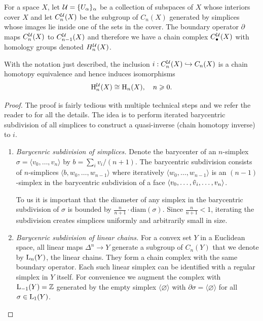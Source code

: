 For a space $X$, let $\mathcal{U}=\{U_\alpha\}_\alpha$ be a collection of subspaces of $X$ whose interiors cover $X$ and let $C_n^{\mathcal{U}}(X)$ be the subgroup of $C_n(X)$ generated by simplices whose images lie inside one of the sets in the cover. The boundary operator $\partial$ maps $C^{\mathcal{U}}_n(X)$ to $C^{\mathcal{U}}_{n-1}(X)$ and therefore we have a chain complex $C_\bullet^{\mathcal{U}}(X)$ with homology groups denoted $H^{\mathcal{U}}_n(X)$.


\begin{prop}\label{thm 2.21 Hatcher}
    With the notation just described, the inclusion $i:C_n^{\mathcal{U}}(X)\hookrightarrow C_n(X)$ is a chain homotopy equivalence and hence induces isomorphisms
    \[\mathrm{H}_n^{\mathcal{U}}(X)\cong \mathrm{H}_n(X),\quad n\geqslant 0.\]
\end{prop}
\begin{proof}
     The proof is fairly tedious with multiple technical steps and we refer the reader to \cite[Thm. 2.21]{Hatcher} for all the details. The idea is to perform iterated barycentric subdivision of all simplices to construct a quasi-inverse (chain homotopy inverse) to $i$. 
     
     \begin{enumerate}
         \item \emph{Barycenric subdivision of simplices.} Denote the barycenter of an $n$-simplex $\sigma=\langle v_0,\ldots,v_n\rangle$ by  $b=\sum_i v_i/(n+1)$. The barycentric subdivision consists of $n$-simplices $\langle b,w_0,\ldots,w_{n-1}
         \rangle$ where iteratively $\langle w_0,\ldots,w_{n-1}\rangle$ is an $(n-1)$-simplex in the barycentric subdivision of a face $\langle v_0,\ldots,\wh{v}_i,\ldots,v_n\rangle$.
         
         To us it is important that the diameter of any simplex in the barycentric subdivision of $\sigma$ is bounded by $\frac{n}{n+1}\cdot \text{diam}(\sigma)$. Since $\frac{n}{n+1}<1$, iterating the subdivision creates simplices uniformly and arbitrarily small in size.
         
         \item \emph{Barycenric subdivision of linear chains.} For a convex set $Y$ in a Euclidean space, all linear maps $\Delta^n\to Y$ generate a subgroup of $C_n(Y)$ that we denote by $\mathrm{L}_n(Y)$, the linear chains. They form a chain complex with the same boundary operator. Each such linear simplex can be identified with a regular simplex in $Y$ itself.  For convenience we augment the complex with $\mathrm{L}_{-1}(Y)=\mathbb{Z}$ generated by the empty simplex $\langle \varnothing \rangle$ with $\partial \sigma=\langle \varnothing \rangle$ for all $\sigma\in \mathrm{L}_1(Y)$.
         

\end{enumerate}
\end{proof}
